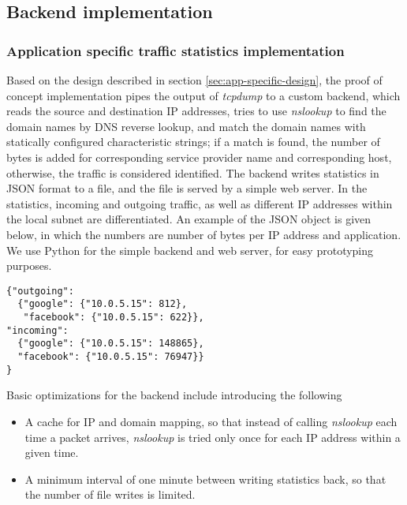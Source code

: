 \subsection{Backend implementation}
\subsubsection{Application specific traffic statistics implementation}

Based on the design described in section \ref{sec:app-specific-design}, the proof of concept implementation pipes the output of \textit{tcpdump} to a custom backend, which reads the source and destination IP addresses, tries to use \textit{nslookup} to find the domain names by DNS reverse lookup, and match the domain names with statically configured characteristic strings; if a match is found, the number of bytes is added for corresponding service provider name and corresponding host, otherwise, the traffic is considered identified. The backend writes statistics in JSON format to a file, and the file is served by a simple web server. In the statistics, incoming and outgoing traffic, as well as different IP addresses within the local subnet are differentiated. An example of the JSON object is given below, in which the numbers are number of bytes per IP address and application. We use Python for the simple backend and web server, for easy prototyping purposes.

\begin{listing}
\begin{verbatim}
{"outgoing": 
  {"google": {"10.0.5.15": 812}, 
   "facebook": {"10.0.5.15": 622}}, 
"incoming": 
  {"google": {"10.0.5.15": 148865}, 
  "facebook": {"10.0.5.15": 76947}}
}
\end{verbatim}
\end{listing}

Basic optimizations for the backend include introducing the following
\begin{itemize}

\item A cache for IP and domain mapping, so that instead of calling \textit{nslookup} each time a packet arrives, \textit{nslookup} is tried only once for each IP address within a given time.

\item A minimum interval of one minute between writing statistics back, so that the number of file writes is limited.

\end{itemize}